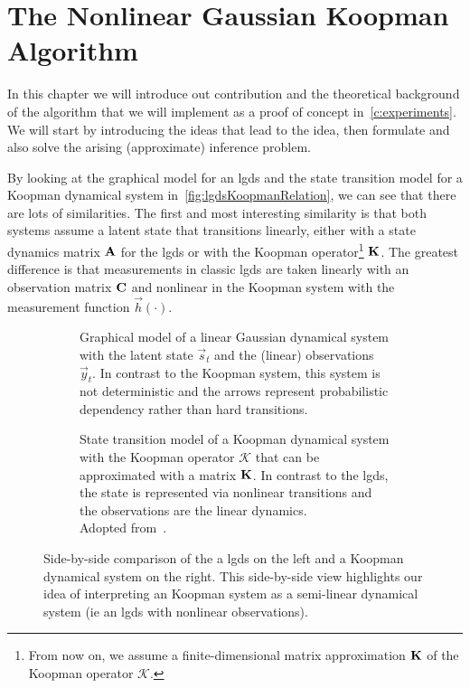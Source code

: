 \chapter{The Nonlinear Gaussian Koopman Algorithm}  %
\label{c:nonlinearGaussianKoopman}



In this chapter we will introduce out contribution and the theoretical background of the \algname algorithm that we will implement as a proof of concept in~\autoref{c:experiments}. We will start by introducing the ideas that lead to the idea, then formulate and also solve the arising (approximate) inference problem.

By looking at the graphical model for an \ac{lgds} and the state transition model for a Koopman dynamical system in~\autoref{fig:lgdsKoopmanRelation}, we can see that there are lots of similarities. The first and most interesting similarity is that both systems assume a latent state that transitions linearly, either with a state dynamics matrix \(\boldsymbol{\mathrm{A}}\) for the \ac{lgds} or with the Koopman operator\footnote{From now on, we assume a finite-dimensional matrix approximation \(\boldsymbol{\mathrm{K}}\) of the Koopman operator \(\mathcal{K}\).} \(\boldsymbol{\mathrm{K}}\). The greatest difference is that measurements in classic \ac{lgds} are taken linearly with an observation matrix \( \boldsymbol{\mathrm{C}} \) and nonlinear in the Koopman system with the measurement function \( \vec{h}(\cdot) \).

\begin{figure}
	\centering
	\begin{subfigure}[t]{0.5\linewidth}
		\centering
		\resizebox{\linewidth}{!}{\tikzLinearGaussianDynamicalSystem}
		\caption{Graphical model of a linear Gaussian dynamical system with the latent state \(\vec{s}_t\) and the (linear) observations \(\vec{y}_t\). In contrast to the Koopman system, this system is not deterministic and the arrows represent probabilistic dependency rather than hard transitions.}
	\end{subfigure}%
	\begin{subfigure}[t]{0.5\linewidth}
		\centering
		\resizebox{\linewidth}{!}{\tikzKoopmanOperator}
		\caption{State transition model of a Koopman dynamical system with the Koopman operator \( \mathcal{K} \) that can be approximated with a matrix \(\boldsymbol{\mathrm{K}}\). In contrast to the \ac{lgds}, the state is represented via nonlinear transitions and the observations are the linear dynamics. \\ Adopted from~\cite{bruntonKoopmanInvariantSubspaces2016}.}
	\end{subfigure}
	\caption{Side-by-side comparison of the a \ac{lgds} on the left and a Koopman dynamical system on the right. This side-by-side view highlights our idea of interpreting an Koopman system as a semi-linear dynamical system (\ac{ie} an \ac{lgds} with nonlinear observations).}
	\label{fig:lgdsKoopmanRelation}
\end{figure}

